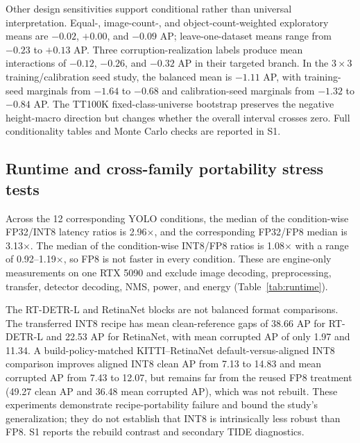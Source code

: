 \documentclass[a4paper,fleqn]{cas-dc}
\begin{document}
Other design sensitivities support conditional rather than universal interpretation. Equal-, image-count-, and object-count-weighted exploratory means are $-0.02$, $+0.00$, and $-0.09$ AP; leave-one-dataset means range from $-0.23$ to $+0.13$ AP. Three corruption-realization labels produce mean interactions of $-0.12$, $-0.26$, and $-0.32$ AP in their targeted branch. In the $3\times3$ training/calibration seed study, the balanced mean is $-1.11$ AP, with training-seed marginals from $-1.64$ to $-0.68$ and calibration-seed marginals from $-1.32$ to $-0.84$ AP. The TT100K fixed-class-universe bootstrap preserves the negative height-macro direction but changes whether the overall interval crosses zero. Full conditionality tables and Monte Carlo checks are reported in S1.

\subsection{Runtime and cross-family portability stress tests}
\label{sec:runtime-results}
\label{sec:crossfamily-results}
\label{sec:attachment-results}
\label{sec:tide-results}

Across the 12 corresponding YOLO conditions, the median of the condition-wise FP32/INT8 latency ratios is 2.96$\times$, and the corresponding FP32/FP8 median is 3.13$\times$. The median of the condition-wise INT8/FP8 ratios is 1.08$\times$ with a range of 0.92--1.19$\times$, so FP8 is not faster in every condition. These are engine-only measurements on one RTX 5090 and exclude image decoding, preprocessing, transfer, detector decoding, NMS, power, and energy (Table~\ref{tab:runtime}).

\begin{table}[t]
\centering
\caption{TensorRT engine measurements on the RTX 5090. Values for each condition are medians of three runs; each row summarizes 12 corresponding YOLO conditions.}
\label{tab:runtime}
\footnotesize
\setlength{\tabcolsep}{3pt}

\end{table}

The RT-DETR-L and RetinaNet blocks are not balanced format comparisons. The transferred INT8 recipe has mean clean-reference gaps of 38.66 AP for RT-DETR-L and 22.53 AP for RetinaNet, with mean corrupted AP of only 1.97 and 11.34. A build-policy-matched KITTI--RetinaNet default-versus-aligned INT8 comparison improves aligned INT8 clean AP from 7.13 to 14.83 and mean corrupted AP from 7.43 to 12.07, but remains far from the reused FP8 treatment (49.27 clean AP and 36.48 mean corrupted AP), which was not rebuilt. These experiments demonstrate recipe-portability failure and bound the study's generalization; they do not establish that INT8 is intrinsically less robust than FP8. S1 reports the rebuild contrast and secondary TIDE diagnostics.
\end{document}

